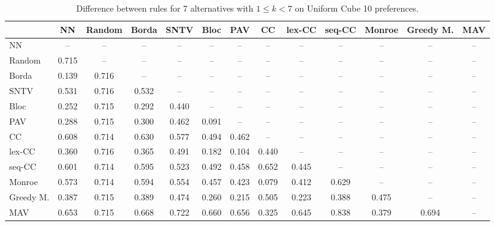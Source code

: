 
\begin{table*}[htbp]
\centering
\begin{tabular}{lcccccccccccc}
\toprule
 & NN & Random & Borda & SNTV & Bloc & PAV & CC & lex-CC & seq-CC & Monroe & Greedy M. & MAV \\
\midrule
NN & -- & -- & -- & -- & -- & -- & -- & -- & -- & -- & -- & -- \\
Random & \cellcolor{blue!71} 0.715 & -- & -- & -- & -- & -- & -- & -- & -- & -- & -- & -- \\
Borda & \cellcolor{blue!13} 0.139 & \cellcolor{blue!71} 0.716 & -- & -- & -- & -- & -- & -- & -- & -- & -- & -- \\
SNTV & \cellcolor{blue!53} 0.531 & \cellcolor{blue!71} 0.716 & \cellcolor{blue!53} 0.532 & -- & -- & -- & -- & -- & -- & -- & -- & -- \\
Bloc & \cellcolor{blue!25} 0.252 & \cellcolor{blue!71} 0.715 & \cellcolor{blue!29} 0.292 & \cellcolor{blue!44} 0.440 & -- & -- & -- & -- & -- & -- & -- & -- \\
PAV & \cellcolor{blue!28} 0.288 & \cellcolor{blue!71} 0.715 & \cellcolor{blue!30} 0.300 & \cellcolor{blue!46} 0.462 & \cellcolor{blue!9} 0.091 & -- & -- & -- & -- & -- & -- & -- \\
CC & \cellcolor{blue!60} 0.608 & \cellcolor{blue!71} 0.714 & \cellcolor{blue!63} 0.630 & \cellcolor{blue!57} 0.577 & \cellcolor{blue!49} 0.494 & \cellcolor{blue!46} 0.462 & -- & -- & -- & -- & -- & -- \\
lex-CC & \cellcolor{blue!36} 0.360 & \cellcolor{blue!71} 0.716 & \cellcolor{blue!36} 0.365 & \cellcolor{blue!49} 0.491 & \cellcolor{blue!18} 0.182 & \cellcolor{blue!10} 0.104 & \cellcolor{blue!44} 0.440 & -- & -- & -- & -- & -- \\
seq-CC & \cellcolor{blue!60} 0.601 & \cellcolor{blue!71} 0.714 & \cellcolor{blue!59} 0.595 & \cellcolor{blue!52} 0.523 & \cellcolor{blue!49} 0.492 & \cellcolor{blue!45} 0.458 & \cellcolor{blue!65} 0.652 & \cellcolor{blue!44} 0.445 & -- & -- & -- & -- \\
Monroe & \cellcolor{blue!57} 0.573 & \cellcolor{blue!71} 0.714 & \cellcolor{blue!59} 0.594 & \cellcolor{blue!55} 0.554 & \cellcolor{blue!45} 0.457 & \cellcolor{blue!42} 0.423 & \cellcolor{blue!7} 0.079 & \cellcolor{blue!41} 0.412 & \cellcolor{blue!62} 0.629 & -- & -- & -- \\
Greedy M. & \cellcolor{blue!38} 0.387 & \cellcolor{blue!71} 0.715 & \cellcolor{blue!38} 0.389 & \cellcolor{blue!47} 0.474 & \cellcolor{blue!26} 0.260 & \cellcolor{blue!21} 0.215 & \cellcolor{blue!50} 0.505 & \cellcolor{blue!22} 0.223 & \cellcolor{blue!38} 0.388 & \cellcolor{blue!47} 0.475 & -- & -- \\
MAV & \cellcolor{blue!65} 0.653 & \cellcolor{blue!71} 0.715 & \cellcolor{blue!66} 0.668 & \cellcolor{blue!72} 0.722 & \cellcolor{blue!66} 0.660 & \cellcolor{blue!65} 0.656 & \cellcolor{blue!32} 0.325 & \cellcolor{blue!64} 0.645 & \cellcolor{blue!83} 0.838 & \cellcolor{blue!37} 0.379 & \cellcolor{blue!69} 0.694 & -- \\
\bottomrule
\end{tabular}

\caption{Difference between rules for 7 alternatives with $1 \leq k < 7$ on Uniform Cube 10 preferences.}
\label{tab:rule_distance_heatmap-m=[7]-pref_dist=euclidean__args__dimensions=10_-_space=uniform_cube}
\end{table*}
    